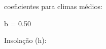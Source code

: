 \documentclass[
]{book}
\newenvironment{Shaded}{\begin{snugshade}}{\end{snugshade}}
\newcommand{\FloatTok}[1]{\textcolor[rgb]{0.00,0.00,0.81}{#1}}
\newcommand{\NormalTok}[1]{#1}
\newcommand{\OperatorTok}[1]{\textcolor[rgb]{0.81,0.36,0.00}{\textbf{#1}}}
\newcommand{\StringTok}[1]{\textcolor[rgb]{0.31,0.60,0.02}{#1}}
\begin{document}
coeficientes para climas médios:

\begin{Shaded}
\begin{Highlighting}[]
\NormalTok{ b =}\StringTok{ }\FloatTok{0.50}
\end{Highlighting}
\end{Shaded}

Insolação (h):

\begin{Shaded}
\end{Shaded}
\end{document}
